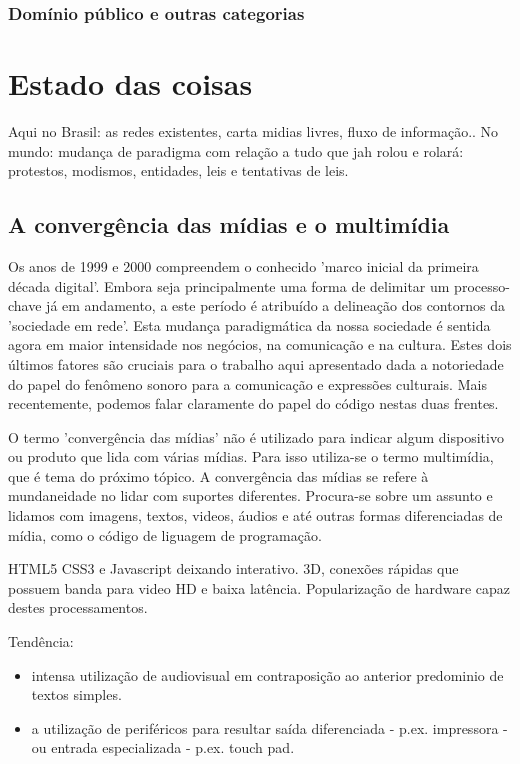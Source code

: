 	  \subsubsection{Domínio público e outras categorias}


  \section{Estado das coisas}
  \label{sec:context}
  Aqui no Brasil: as redes existentes, carta midias livres, fluxo de informação..
  No mundo: mudança de paradigma com relação a tudo que jah rolou e rolará:
  protestos, modismos, entidades, leis e tentativas de leis.

      \subsection{A convergência das mídias e o multimídia}
      \label{sec:midiamultimidia}

      Os anos de 1999 e 2000 compreendem o conhecido 'marco inicial da primeira década digital'.
      Embora seja principalmente uma forma de delimitar um processo-chave já em andamento, a este período é atribuído
      a delineação dos contornos da 'sociedade em rede'. Esta mudança paradigmática da nossa
      sociedade é sentida agora em maior intensidade nos negócios, na comunicação e na cultura. Estes dois
      últimos fatores são cruciais para o trabalho aqui apresentado dada a notoriedade do papel do
      fenômeno sonoro para a comunicação e expressões culturais. Mais recentemente, podemos falar claramente
      do papel do código nestas duas frentes.

      O termo 'convergência das mídias' não é utilizado para indicar algum dispositivo ou produto que
      lida com várias mídias. Para isso utiliza-se o termo multimídia, que é tema do próximo tópico.
      A convergência das mídias se refere à mundaneidade no lidar com suportes diferentes. Procura-se
      sobre um assunto e lidamos com imagens, textos, videos, áudios e até outras formas diferenciadas
      de mídia, como o código de liguagem de programação.


      HTML5 CSS3 e Javascript deixando interativo. 3D, conexões rápidas que possuem banda para video HD e
      baixa latência. Popularização de hardware capaz destes processamentos.

      Tendência:
      \begin{itemize}
	  \item intensa utilização de audiovisual em contraposição ao
      anterior predominio de textos simples.
	  \item a utilização de periféricos para resultar saída diferenciada - p.ex.
      impressora - ou entrada especializada - p.ex. touch pad.
      \end{itemize}



